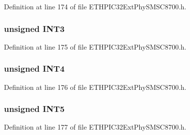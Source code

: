 Definition at line 174 of file E\+T\+H\+P\+I\+C32\+Ext\+Phy\+S\+M\+S\+C8700.\+h.

\hypertarget{union_____i_n_t_s_o_u_r_c_ebits__t_a6c886eb45c0096c0d3bc37b05416b171}{}
\subsubsection[{I\+N\+T3}]{\setlength{\rightskip}{0pt plus 5cm}unsigned I\+N\+T3}\label{union_____i_n_t_s_o_u_r_c_ebits__t_a6c886eb45c0096c0d3bc37b05416b171}


Definition at line 175 of file E\+T\+H\+P\+I\+C32\+Ext\+Phy\+S\+M\+S\+C8700.\+h.

\hypertarget{union_____i_n_t_s_o_u_r_c_ebits__t_af8c7aac64c1dded6d4bab1e8d958bc19}{}
\subsubsection[{I\+N\+T4}]{\setlength{\rightskip}{0pt plus 5cm}unsigned I\+N\+T4}\label{union_____i_n_t_s_o_u_r_c_ebits__t_af8c7aac64c1dded6d4bab1e8d958bc19}


Definition at line 176 of file E\+T\+H\+P\+I\+C32\+Ext\+Phy\+S\+M\+S\+C8700.\+h.

\hypertarget{union_____i_n_t_s_o_u_r_c_ebits__t_a832ae44f354c9afd727f5ace181e439f}{}
\subsubsection[{I\+N\+T5}]{\setlength{\rightskip}{0pt plus 5cm}unsigned I\+N\+T5}\label{union_____i_n_t_s_o_u_r_c_ebits__t_a832ae44f354c9afd727f5ace181e439f}


Definition at line 177 of file E\+T\+H\+P\+I\+C32\+Ext\+Phy\+S\+M\+S\+C8700.\+h.

